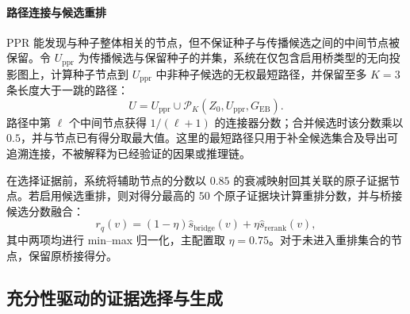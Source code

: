 \paragraph{路径连接与候选重排}
PPR 能发现与种子整体相关的节点，但不保证种子与传播候选之间的中间节点被保留。令 $U_{\mathrm{ppr}}$ 为传播候选与保留种子的并集，系统在仅包含启用桥类型的无向投影图上，计算种子节点到 $U_{\mathrm{ppr}}$ 中非种子候选的无权最短路径，并保留至多 $K=3$ 条长度大于一跳的路径：
\begin{equation}
\label{eq:connector}
U=U_{\mathrm{ppr}}\cup
\mathcal{P}_K(Z_0,U_{\mathrm{ppr}},G_{\mathrm{EB}}).
\end{equation}
路径中第 $\ell$ 个中间节点获得 $1/(\ell+1)$ 的连接器分数；合并候选时该分数乘以 $0.5$，并与节点已有得分取最大值。这里的最短路径只用于补全候选集合及导出可追溯连接，不被解释为已经验证的因果或推理链。

在选择证据前，系统将辅助节点的分数以 $0.85$ 的衰减映射回其关联的原子证据节点。若启用候选重排，则对得分最高的 $50$ 个原子证据块计算重排分数，并与桥接候选分数融合：
\begin{equation}
\label{eq:candidate_rerank}
r_q(v)=(1-\eta)\widehat{s}_{\mathrm{bridge}}(v)
+\eta\widehat{s}_{\mathrm{rerank}}(v),
\end{equation}
其中两项均进行 min--max 归一化，主配置取 $\eta=0.75$。对于未进入重排集合的节点，保留原桥接得分。

\subsection{充分性驱动的证据选择与生成}
\label{sec:sufficiency_control}

